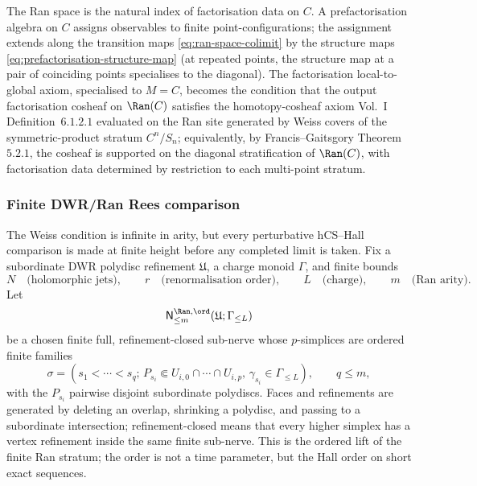 The Ran space is the natural index of factorisation data on $C$. A
prefactorisation algebra on $C$ assigns observables to finite
point-configurations; the assignment extends along the transition maps
\eqref{eq:ran-space-colimit} by the structure maps
\eqref{eq:prefactorisation-structure-map} (at repeated points, the
structure map at a pair of coinciding points specialises to the
diagonal). The factorisation local-to-global axiom, specialised to
$M = C$, becomes the condition that the output factorisation cosheaf
on $\Ran(C)$ satisfies the homotopy-cosheaf axiom
\cite{CostelloGwilliam} Vol.~I Definition~$6.1.2.1$ evaluated on the
Ran site generated by Weiss covers of the symmetric-product stratum
$C^n/S_n$; equivalently, by Francis--Gaitsgory
\cite{FrancisGaitsgory2012} Theorem~$5.2.1$, the cosheaf is supported on
the diagonal stratification of $\Ran(C)$, with factorisation data
determined by restriction to each multi-point stratum.

\subsubsection{Finite DWR/Ran Rees comparison}
\label{subsec:finite-dwr-ran-rees-comparison}

The Weiss condition is infinite in arity, but every perturbative
hCS--Hall comparison is made at finite height before any completed
limit is taken. Fix a subordinate DWR polydisc refinement
$\mathfrak U$, a charge monoid $\Gamma$, and finite bounds
\[
 N \quad\text{(holomorphic jets)},\qquad
 r \quad\text{(renormalisation order)},\qquad
 L \quad\text{(charge)},\qquad
 m \quad\text{(Ran arity)}.
\]
Let
\[
 \mathsf N^{\Ran,\ord}_{\le m}(\mathfrak U;\Gamma_{\le L})
\]
be a chosen finite full, refinement-closed sub-nerve whose $p$-simplices
are ordered finite families
\[
 \sigma=(s_1<\cdots<s_q;\,P_{s_i}\Subset
 U_{i,0}\cap\cdots\cap U_{i,p},\,\gamma_{s_i}\in\Gamma_{\le L}),
 \qquad q\le m,
\]
with the $P_{s_i}$ pairwise disjoint subordinate polydiscs. Faces and
refinements are generated by deleting an overlap, shrinking a
polydisc, and passing to a subordinate intersection; refinement-closed
means that every higher simplex has a vertex refinement inside the same
finite sub-nerve. This is the ordered lift of the finite Ran stratum;
the order is not a time parameter, but the Hall order on short exact
sequences.

